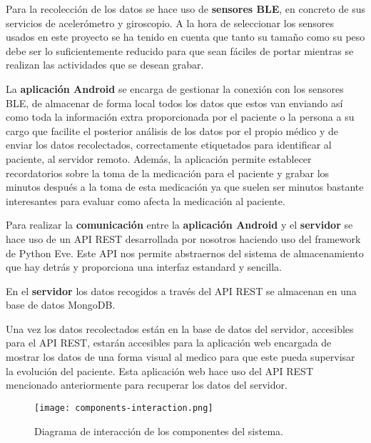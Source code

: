 \documentclass[11pt,spanish]{article}
\begin{document}
Para la recolección de los datos se hace uso de \textbf{sensores BLE}, en concreto de sus servicios de acelerómetro y giroscopio. A la hora de seleccionar los sensores usados en este proyecto se ha tenido en cuenta que tanto su tamaño como su peso debe ser lo suficientemente reducido para que sean fáciles de portar mientras se realizan las actividades que se desean grabar.
\newline

La \textbf{aplicación Android} se encarga de gestionar la conexión con los sensores BLE, de almacenar de forma local todos los datos que estos van enviando así como toda la información extra proporcionada por el paciente o la persona a su cargo que facilite el posterior análisis de los datos por el propio médico y de enviar los datos recolectados, correctamente etiquetados para identificar al paciente, al servidor remoto. Además, la aplicación permite establecer recordatorios sobre la toma de la medicación para el paciente y grabar los minutos después a la toma de esta medicación ya que suelen ser minutos bastante interesantes para evaluar como afecta la medicación al paciente.
\newline

Para realizar la \textbf{comunicación} entre la \textbf{aplicación Android} y el \textbf{servidor} se hace uso de un API REST desarrollada por nosotros haciendo uso del framework de Python Eve. Este API nos permite abstraernos del sistema de almacenamiento que hay detrás y proporciona una interfaz estandard y sencilla.
\newline

En el \textbf{servidor} los datos recogidos a través del API REST se almacenan en una base de datos MongoDB.
\newline

Una vez los datos recolectados están en la base de datos del servidor, accesibles para el API REST, estarán accesibles para la aplicación web encargada de mostrar los datos de una forma visual al medico para que este pueda supervisar la evolución del paciente. Esta aplicación web hace uso del API REST mencionado anteriormente para recuperar los datos del servidor.
\newline

\begin{figure}[H]
  \centering
  \texttt{[image: components-interaction.png]}
  \caption{Diagrama de interacción de los componentes del sistema.}
\end{figure}
\end{document}
